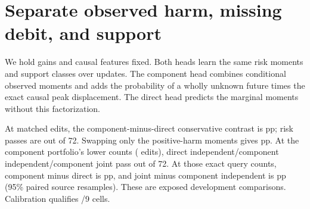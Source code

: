 \section{Separate observed harm, missing debit, and support}
We hold gains and causal features fixed. Both heads learn the
same risk moments and support classes over \RiskPartsUpdates{}
updates. The component head combines conditional observed
moments and adds the probability of a wholly unknown future
times the exact causal peak displacement. The direct head predicts
the marginal moments without this factorization.

At \RiskPartsEdits{} matched edits, the component-minus-direct
conservative contrast is \RiskPartsHigh{} pp; risk passes are
\RiskPartsPasses{} out of 72. Swapping only the positive-harm
moments gives \RiskPartsHarmSwap{} pp.
At the component portfolio's lower counts (\RiskPartsLowEdits{}
edits), direct independent/component independent/component joint
pass \RiskPartsLowPasses{} out of 72. At those exact query counts,
component minus direct is \RiskPartsLow{} pp, and joint minus
component independent is \RiskPartsJoint{} pp (95\% paired source
resamples). These are exposed development comparisons.
Calibration qualifies \RiskPartsQual{}/9 cells.
